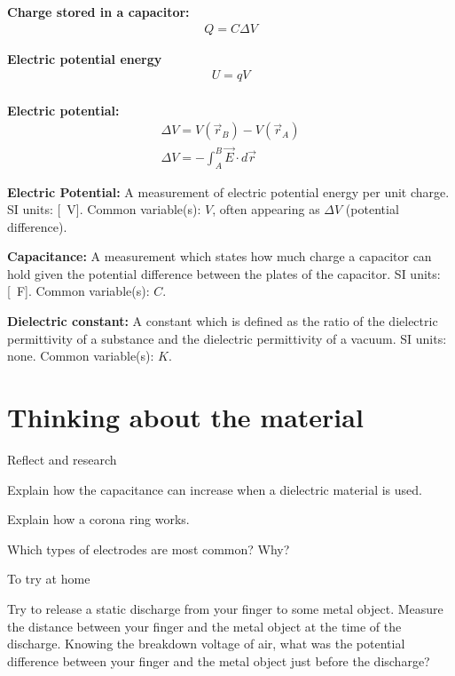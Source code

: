\newpage
\begin{importantEquations}
\medskip
\begin{multicols}{2}
\textbf{Charge stored in a capacitor:}
\begin{align*}
Q = C\Delta V
\end{align*}

\textbf{Electric potential energy}
\begin{align*}
U=qV
\end{align*}
\columnbreak
\\
\textbf{Electric potential:}
\begin{align*}
\Delta V = V(\vec r_B)-V(\vec r_A)\\
\Delta V = -\int_{A}^{B}\vec E \cdot d\vec r
\end{align*}
\medskip
\end{multicols}
\end{importantEquations}

\begin{definitions}
	\textbf{Electric Potential:} A measurement of electric potential energy per unit charge. SI units: [\SI{}{V}]. Common variable(s): $V$, often appearing as $\Delta V$ (potential difference).
	\medskip
	\item \textbf{Capacitance:} A measurement which states how much charge a capacitor can hold given the potential difference between the plates of the capacitor. SI units: [\SI{}{F}]. Common variable(s): $C$.
	\medskip
	\item \textbf{Dielectric constant:} A constant which is defined as the ratio of the dielectric permittivity of a substance and the dielectric permittivity of a vacuum. SI units: none. Common variable(s): $K$.
\end{definitions}

\newpage
\section{Thinking about the material}

\begin{chapteractivity}{Reflect and research}
{
\item Explain how the capacitance can increase when a dielectric material is used.
\item Explain how a corona ring works.
\item Which types of electrodes are most common? Why?
}
\end{chapteractivity}

\begin{chapteractivity}{To try at home}
{
\item Try to release a static discharge from your finger to some metal object. Measure the distance between your finger and the metal object at the time of the discharge. Knowing the breakdown voltage of air, what was the potential difference between your finger and the metal object just before the discharge?
}
\end{chapteractivity}

